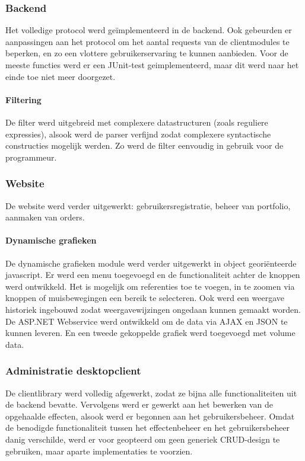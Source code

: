 \subsubsection{Backend}
Het volledige protocol werd ge\"implementeerd in de backend. Ook gebeurden er aanpassingen aan het protocol om het aantal requests van de clientmodules te beperken, en zo een vlottere gebruikerservaring te kunnen aanbieden.
Voor de meeste functies werd er een JUnit-test geimplementeerd, maar dit werd naar het einde toe niet meer doorgezet.

\paragraph{Filtering}
De filter werd uitgebreid met complexere datastructuren (zoals reguliere expressies), alsook werd de parser verfijnd zodat complexere syntactische constructies mogelijk werden. Zo werd de filter eenvoudig in gebruik voor de programmeur.

\subsubsection{Website}
De website werd verder uitgewerkt: gebruikersregistratie, beheer van portfolio, aanmaken van orders.

\paragraph{Dynamische grafieken}
De dynamische grafieken module werd verder uitgewerkt in object geori\"enteerde javascript. Er werd een menu toegevoegd en de functionaliteit achter de knoppen werd ontwikkeld. Het is mogelijk om referenties toe te voegen, in te zoomen via knoppen of muisbewegingen een bereik te selecteren.
Ook werd een weergave historiek ingebouwd zodat weergavewijzingen ongedaan kunnen gemaakt worden. De ASP.NET Webservice werd ontwikkeld om de data via AJAX en JSON te kunnen leveren. En een tweede gekoppelde grafiek werd toegevoegd met volume data.

\subsubsection{Administratie desktopclient}
De clientlibrary werd volledig afgewerkt, zodat ze bijna alle functionaliteiten uit de backend bevatte.
Vervolgens werd er gewerkt aan het bewerken van de opgehaalde effecten, alsook werd er begonnen aan het gebruikersbeheer. Omdat de benodigde functionaliteit tussen het effectenbeheer en het gebruikersbeheer danig verschilde, werd er voor geopteerd om geen generiek CRUD-design te gebruiken, maar aparte implementaties te voorzien.

